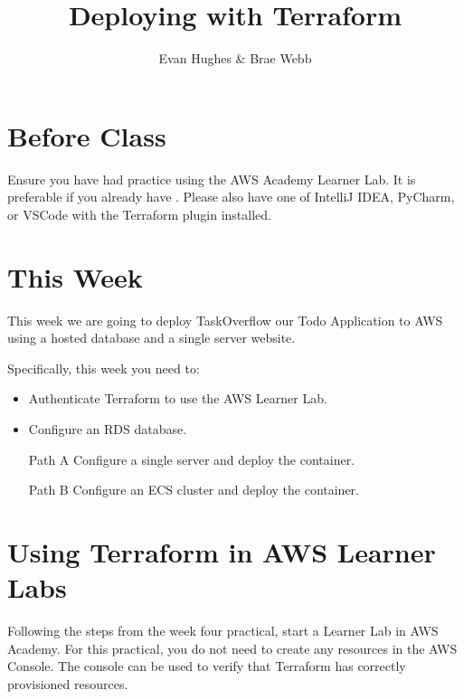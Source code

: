 \documentclass{csse4400}
\title{Deploying with Terraform}
\author{Evan Hughes \& Brae Webb}
\date{\week{5}}
\begin{document}
\maketitle

\section{Before Class}
Ensure you have had practice using the AWS Academy Learner Lab.
It is preferable if you already have .
Please also have one of IntelliJ IDEA, PyCharm, or VSCode with the Terraform plugin installed.

\section{This Week}
This week we are going to deploy TaskOverflow our Todo Application to AWS using a hosted database and a single server website.

Specifically, this week you need to:
\begin{itemize}
    \item Authenticate Terraform to use the AWS Learner Lab.
    \item Configure an RDS database.
    \item [Path A] Configure a single server and deploy the container.
    \item [Path B] Configure an ECS cluster and deploy the container.
\end{itemize}

\section{Using Terraform in AWS Learner Labs}
Following the steps from the week four practical, start a Learner Lab in AWS Academy.
For this practical, you do not need to create any resources in the AWS Console.
The console can be used to verify that Terraform has correctly provisioned resources.
\end{document}
